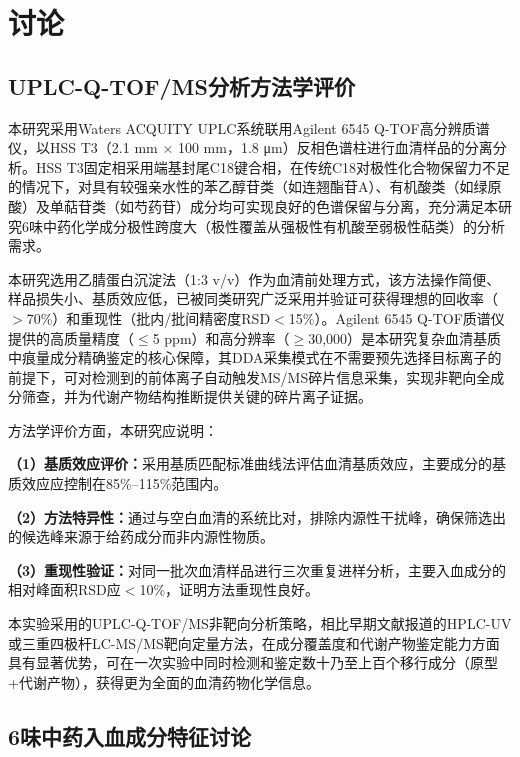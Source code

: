 \documentclass[12pt,a4paper,UTF8,openany]{ctexbook}
\begin{document}
\chapter{讨\quad 论}

\section{UPLC-Q-TOF/MS分析方法学评价}

本研究采用Waters ACQUITY UPLC系统联用Agilent 6545 Q-TOF高分辨质谱仪，以HSS T3（2.1 mm $\times$ 100 mm，1.8 μm）反相色谱柱进行血清样品的分离分析。HSS T3固定相采用端基封尾C18键合相，在传统C18对极性化合物保留力不足的情况下，对具有较强亲水性的苯乙醇苷类（如连翘酯苷A）、有机酸类（如绿原酸）及单萜苷类（如芍药苷）成分均可实现良好的色谱保留与分离，充分满足本研究6味中药化学成分极性跨度大（极性覆盖从强极性有机酸至弱极性萜类）的分析需求\cite{Wang2016,FengX2020}。

本研究选用乙腈蛋白沉淀法（1:3 v/v）作为血清前处理方式，该方法操作简便、样品损失小、基质效应低，已被同类研究广泛采用并验证可获得理想的回收率（$>$70\%）和重现性（批内/批间精密度RSD$<$15\%）\cite{Tong2010,FengX2020}。Agilent 6545 Q-TOF质谱仪提供的高质量精度（$\leq$5 ppm）和高分辨率（$\geq$30,000）是本研究复杂血清基质中痕量成分精确鉴定的核心保障，其DDA采集模式在不需要预先选择目标离子的前提下，可对检测到的前体离子自动触发MS/MS碎片信息采集，实现非靶向全成分筛查，并为代谢产物结构推断提供关键的碎片离子证据\cite{WangF2018,Liu2008}。

方法学评价方面，本研究应说明：

\textbf{（1）基质效应评价：}采用基质匹配标准曲线法评估血清基质效应，主要成分的基质效应应控制在85\%--115\%范围内。

\textbf{（2）方法特异性：}通过与空白血清的系统比对，排除内源性干扰峰，确保筛选出的候选峰来源于给药成分而非内源性物质。

\textbf{（3）重现性验证：}对同一批次血清样品进行三次重复进样分析，主要入血成分的相对峰面积RSD应$<$10\%，证明方法重现性良好。

本实验采用的UPLC-Q-TOF/MS非靶向分析策略，相比早期文献报道的HPLC-UV或三重四极杆LC-MS/MS靶向定量方法，在成分覆盖度和代谢产物鉴定能力方面具有显著优势，可在一次实验中同时检测和鉴定数十乃至上百个移行成分（原型+代谢产物），获得更为全面的血清药物化学信息\cite{WangY2023}。

\section{6味中药入血成分特征讨论}
\end{document}
